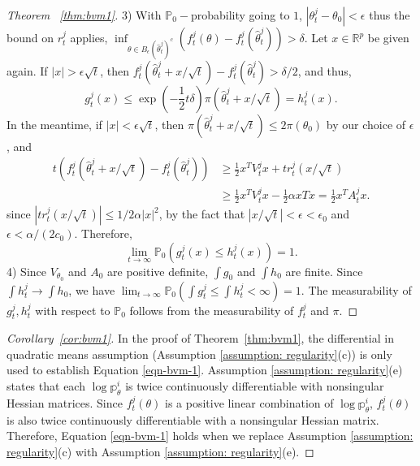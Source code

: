 \documentclass[twoside,11pt]{article}
\numberwithin{equation}{section}
\newcommand{\R}{{\mathbb{R}}}
\newcommand\bP{\mathbb{P}}
\newcommand\bp{\mathbb{p}}
\begin{document}
{\begin{proof}[Theorem ~\ref{thm:bvm1}]
3) With $\bP_0-$probability going to $1$,  $|\theta_t^j - \theta_0| < \epsilon$ thus the bound on $r_t^j$ applies, $\inf_{\theta \in B_\epsilon(\hat\theta_t^j)^c} (f_t^j(\theta) - f_t^j(\hat\theta_t^j)) > \delta$. Let $x \in \R^p$ be given again. If $|x| > \epsilon \sqrt{t}$, then $f_t^j(\hat\theta_t^j+ x/\sqrt{t}) - f_t^j(\hat\theta_t^j) > \delta/2$, and thus, 
\begin{equation*}
    g_t^j(x) \leq \exp(-\frac{1}{2} t \delta) \pi(\hat\theta_t^j+ x/\sqrt{t}) = h_t^j(x). 
\end{equation*}
In the meantime, if $|x| < \epsilon \sqrt{t}$, then $\pi(\hat\theta_t^j+ x/\sqrt{t}) \leq 2 \pi(\theta_0)$ by our choice of $\epsilon$, and 
\begin{align*}
     t(f_t^j(\hat\theta_t^j + x/\sqrt{t}) - f_t^j(\hat\theta_t^j)) 
    &\geq \frac{1}{2} x^T V_t^j x + t r_t^j(x/\sqrt{t}) \\
    &\geq  \frac{1}{2} x^T V_t^j x - \frac{1}{2}\alpha xT x = \frac{1}{2}x^T A_t^j x. 
\end{align*}
since $|t r_t^j (x/\sqrt{t})| \leq 1/2 \alpha |x|^2$, by the fact that $|x/\sqrt{t}| < \epsilon < \epsilon_0$ and $\epsilon < \alpha/(2c_0)$. Therefore, 
\begin{equation*}
    \lim_{t \to \infty}\bP_0\left(g_t^j (x) \leq h_t^j(x)\right) = 1. 
\end{equation*}
4) Since $V_{\theta_0}$ and $A_0$ are positive definite, $\int g_0$ and $\int h_0$ are finite. Since $\int h_t^j \to \int h_0$, we have $\lim_{t \to \infty} \bP_0(\int g_t^j \leq \int h_t^j < \infty)  = 1$. The measurability of $g_t^j, h_t^j$ with respect to $\bP_0$ follows from the measurability of $f_t^j$ and $\pi$. 
\end{proof}

\begin{proof}[Corollary~\ref{cor:bvm1}]
In the proof of Theorem~\ref{thm:bvm1}, the differential in quadratic means assumption (Assumption \ref{assumption: regularity}(c)) is only used to establish Equation \eqref{eqn-bvm-1}. Assumption \ref{assumption: regularity}(e) states that each $\log \bp_\theta^i$ is twice continuously differentiable with nonsingular Hessian matrices. Since $f_t^j(\theta)$ is a positive linear combination of $\log \bp_\theta^i$, $f_t^j(\theta)$ is also twice continuously differentiable with a nonsingular Hessian matrix.  Therefore, Equation \eqref{eqn-bvm-1} holds when we replace Assumption \ref{assumption: regularity}(c) with Assumption \ref{assumption: regularity}(e). 
\end{proof}

}
\end{document}
